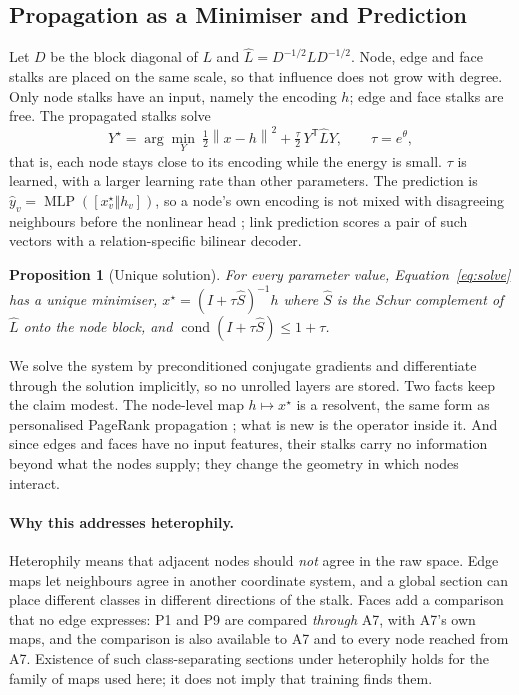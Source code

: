 \documentclass{article}
\newtheorem{proposition}{Proposition}
\newcommand{\norm}[1]{\left\lVert #1\right\rVert}
\newcommand{\transpose}{\mathsf{T}}
\newcommand{\concat}{\mathbin\Vert}
\begin{document}
\subsection{Propagation as a Minimiser and Prediction}
\label{sec:prop}
Let $D$ be the block diagonal of $L$ and $\hat L=D^{-1/2}LD^{-1/2}$. Node, edge and face stalks are placed on the same scale, so that influence does not grow with degree. Only node stalks have an input, namely the encoding $h$; edge and face stalks are free. The propagated stalks solve
\begin{equation}
  Y^\star=\arg\min_Y\ \tfrac12\norm{x-h}^2+\tfrac{\tau}{2}\,Y^{\transpose}\hat LY,\qquad \tau=e^{\theta},
  \label{eq:solve}
\end{equation}
that is, each node stays close to its encoding while the energy is small. $\tau$ is learned, with a larger learning rate than other parameters. The prediction is $\hat y_v=\operatorname{MLP}([x^\star_v\concat h_v])$, so a node's own encoding is not mixed with disagreeing neighbours before the nonlinear head \cite{zhu2020beyond}; link prediction scores a pair of such vectors with a relation-specific bilinear decoder.

\begin{proposition}[Unique solution]\label{prop:unique}
For every parameter value, Equation~\eqref{eq:solve} has a unique minimiser, $x^\star=(I+\tau\hat S)^{-1}h$ where $\hat S$ is the Schur complement of $\hat L$ onto the node block, and $\operatorname{cond}(I+\tau\hat S)\le1+\tau$.
\end{proposition}
We solve the system by preconditioned conjugate gradients and differentiate through the solution implicitly, so no unrolled layers are stored. Two facts keep the claim modest. The node-level map $h\mapsto x^\star$ is a resolvent, the same form as personalised PageRank propagation \cite{gasteiger2019appnp}; what is new is the operator inside it. And since edges and faces have no input features, their stalks carry no information beyond what the nodes supply; they change the geometry in which nodes interact.

\paragraph{Why this addresses heterophily.} Heterophily means that adjacent nodes should \emph{not} agree in the raw space. Edge maps let neighbours agree in another coordinate system, and a global section can place different classes in different directions of the stalk. Faces add a comparison that no edge expresses: P1 and P9 are compared \emph{through} A7, with A7's own maps, and the comparison is also available to A7 and to every node reached from A7. Existence of such class-separating sections under heterophily holds for the family of maps used here; it does not imply that training finds them.
\end{document}
